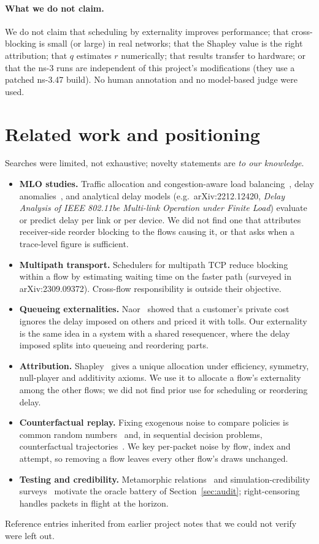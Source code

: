 \documentclass[11pt]{article}
\begin{document}
\paragraph{What we do not claim.} We do not claim that scheduling by externality improves performance; that cross-blocking is small (or large) in real networks; that the Shapley value is the right attribution; that $q$ estimates $r$ numerically; that results transfer to hardware; or that the ns-3 runs are independent of this project's modifications (they use a patched ns-3.47 build). No human annotation and no model-based judge were used.

\section{Related work and positioning}
Searches were limited, not exhaustive; novelty statements are \emph{to our knowledge}.
\begin{itemize}
  \item \textbf{MLO studies.} Traffic allocation and congestion-aware load balancing~\cite{lopezraventos2022mlo}, delay anomalies~\cite{carrascosa2023understanding}, and analytical delay models (e.g.\ arXiv:2212.12420, \emph{Delay Analysis of IEEE 802.11be Multi-link Operation under Finite Load}) evaluate or predict delay per link or per device. We did not find one that attributes receiver-side reorder blocking to the flows causing it, or that asks when a trace-level figure is sufficient.
  \item \textbf{Multipath transport.} Schedulers for multipath TCP reduce blocking within a flow by estimating waiting time on the faster path (surveyed in arXiv:2309.09372). Cross-flow responsibility is outside their objective.
  \item \textbf{Queueing externalities.} Naor~\cite{naor1969tolls} showed that a customer's private cost ignores the delay imposed on others and priced it with tolls. Our externality is the same idea in a system with a shared resequencer, where the delay imposed splits into queueing and reordering parts.
  \item \textbf{Attribution.} Shapley~\cite{shapley1953value} gives a unique allocation under efficiency, symmetry, null-player and additivity axioms. We use it to allocate a flow's externality among the other flows; we did not find prior use for scheduling or reordering delay.
  \item \textbf{Counterfactual replay.} Fixing exogenous noise to compare policies is common random numbers~\cite{glasserman1992crn} and, in sequential decision problems, counterfactual trajectories~\cite{oberst2019counterfactual}. We key per-packet noise by flow, index and attempt, so removing a flow leaves every other flow's draws unchanged.
  \item \textbf{Testing and credibility.} Metamorphic relations~\cite{chen2018metamorphic} and simulation-credibility surveys~\cite{kurkowski2005manet} motivate the oracle battery of Section~\ref{sec:audit}; right-censoring~\cite{kaplan1958nonparametric} handles packets in flight at the horizon.
\end{itemize}
Reference entries inherited from earlier project notes that we could not verify were left out.
\end{document}

